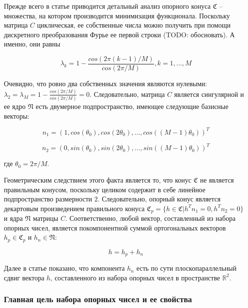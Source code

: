 \documentclass[a4paper, 12pt, titlepage]{article}
\theoremstyle{definition}
\theoremstyle{plain}
\theoremstyle{plain}
\begin{document}
Прежде всего в статье приводится детальный анализ опорного конуса $\mathfrak{C}$
-- множества, на котором производится минимизация функционала. Поскольку матрица
$C$ циклическая, ее собственные числа можно получить при помощи дискретного
преобразования Фурье ее первой строки (TODO: обосновать). А именно, они равны

\begin{equation}
\lambda_{k} = 1 - \frac{cos(2 \pi (k - 1) / M)}{cos(2 \pi / M)},
k = 1, \ldots, M
\end{equation}

Очевидно, что ровно два собственных значения являются нулевыми:
$\lambda_{2} = \lambda_{M} = 1 - \frac{cos(2 \pi / M)}{cos(2 \pi / M)} = 0$.
Следовательно, матрица $C$ является сингулярной и ее ядро $\mathfrak{N}$ есть
двумерное подпространство, имеющее следующие базисные векторы:

\begin{equation}
n_{1} = (1, cos(\theta_{0}), cos(2 \theta_{0}), \ldots,
cos((M - 1) \theta_{0}))^{T}
\end{equation}

\begin{equation}
n_{2} = (0, sin(\theta_{0}), sin(2 \theta_{0}), \ldots,
sin((M - 1) \theta_{0}))^{T}
\end{equation}

где $\theta_{0} = 2 \pi / M$.

Геометрическим следствием этого факта является то, что конус $\mathfrak{C}$ не
является правильным конусом, поскольку целиком содержит в себе линейное
подпространство размерности 2. Следовательно, опорный конус является декартовым
произведением правильного конуса
$\mathfrak{C}_{p} = \{h \in \mathfrak{C} | h^{T} n_{1} = 0, h^{T} n_{2} = 0\}$
и ядра $\mathfrak{N}$ матрицы $C$. Соответственно, любой вектор, составленный из
набора опорных чисел, является покомпонентной суммой ортогональных векторов
$h_{p} \in \mathfrak{C}_{p}$ и $h_{n} \in \mathfrak{N}$:

\begin{equation}
 h = h_{p} + h_{n}
\end{equation}

Далее в статье показано, что компонента $h_{n}$ есть по сути плоскопараллельный
сдвиг вектора $h$, составленного из набора опорных чисел в пространстве
$\mathbb{R}^{2}$.


\subsubsection{Главная цель набора опорных чисел и ее свойства}
\label{sec:support-methods:2d-uniform:basic-object}
\end{document}

